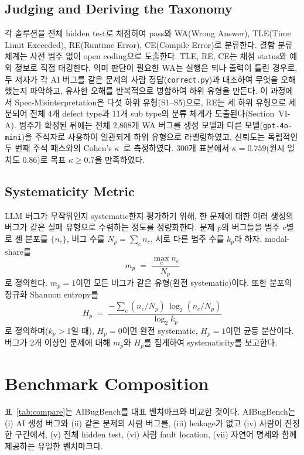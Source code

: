 \documentclass[10pt,conference]{IEEEtran}
\begin{document}
\subsection{Judging and Deriving the Taxonomy}
각 솔루션을 전체 hidden test로 채점하여 pass와 WA(Wrong Answer), TLE(Time Limit Exceeded), RE(Runtime Error), CE(Compile Error)로 분류한다. 결함 분류 체계는 사전 범주 없이 open coding으로 도출한다. TLE, RE, CE는 채점 status와 예외 정보로 직접 태깅한다. 의미 판단이 필요한 WA는 실행은 되나 출력이 틀린 경우로, 두 저자가 각 AI 버그를 같은 문제의 사람 정답(\texttt{correct.py})과 대조하여 무엇을 오해했는지 파악하고, 유사한 오해를 반복적으로 병합하여 하위 유형을 만든다. 이 과정에서 Spec-Misinterpretation은 다섯 하위 유형(S1--S5)으로, RE는 세 하위 유형으로 세분되어 전체 4개 defect type과 11개 sub type의 분류 체계가 도출된다(Section~VI-A). 범주가 확정된 뒤에는 전체 2{,}808개 WA 버그를 생성 모델과 다른 모델(\texttt{gpt-4o-mini})을 주석자로 사용하여 일관되게 하위 유형으로 라벨링하였고, 신뢰도는 독립적인 두 번째 주석 패스와의 Cohen's $\kappa$~\cite{cohen1960kappa}로 측정하였다. 300개 표본에서 $\kappa=0.759$(원시 일치도 0.86)로 목표 $\kappa\geq 0.7$을 만족하였다.

\subsection{Systematicity Metric}
LLM 버그가 무작위인지 systematic한지 평가하기 위해, 한 문제에 대한 여러 생성의 버그가 같은 실패 유형으로 수렴하는 정도를 정량화한다. 문제 $p$의 버그들을 범주 $c$별로 센 분포를 $\{n_c\}$, 버그 수를 $N_p=\sum_c n_c$, 서로 다른 범주 수를 $k_p$라 하자. modal-share를
\[
m_p \;=\; \frac{\max_c n_c}{N_p}
\]
로 정의한다. $m_p=1$이면 모든 버그가 같은 유형(완전 systematic)이다. 또한 분포의 정규화 Shannon entropy를
\[
H_p \;=\; \frac{-\sum_c (n_c/N_p)\,\log_2 (n_c/N_p)}{\log_2 k_p}
\]
로 정의하며($k_p>1$일 때), $H_p=0$이면 완전 systematic, $H_p=1$이면 균등 분산이다. 버그가 2개 이상인 문제에 대해 $m_p$와 $H_p$를 집계하여 systematicity를 보고한다.

\section{Benchmark Composition}
표~\ref{tab:compare}는 AIBugBench를 대표 벤치마크와 비교한 것이다. AIBugBench는 (i) AI 생성 버그와 (ii) 같은 문제의 사람 버그를, (iii) leakage가 없고 (iv) 사람이 진정한 구간에서, (v) 전체 hidden test, (vi) 사람 fault location, (vii) 자연어 명세와 함께 제공하는 유일한 벤치마크다.
\end{document}
